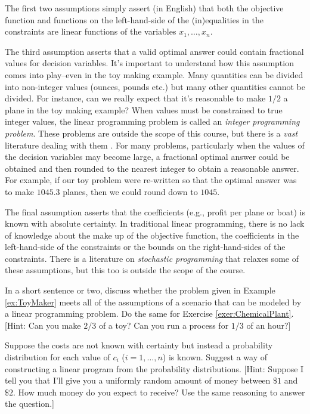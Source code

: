 The first two assumptions simply assert (in English) that both the objective function and functions on the left-hand-side of the (in)equalities in the constraints are linear functions of the variables $x_1,\dots,x_n$. 

The third assumption asserts that a valid optimal answer could contain fractional values for decision variables. It's important to understand how this assumption comes into play--even in the toy making example. Many quantities can be divided into non-integer values (ounces, pounds etc.) but many other quantities cannot be divided. For instance, can we really expect that it's reasonable to make $1/2$ a plane in the toy making example? When values must be constrained to true integer values, the linear programming problem is called an \textit{integer programming problem}. These problems are outside the scope of this course, but there is a \textit{vast} literature dealing with them \cite{PS98,WN99}. For many problems, particularly when the values of the decision variables may become large, a fractional optimal answer could be obtained and then rounded to the nearest integer to obtain a reasonable answer. For example, if our toy problem were re-written so that the optimal answer was to make $1045.3$ planes, then we could round down to $1045$.

The final assumption asserts that the coefficients (e.g., profit per plane or boat) is known with absolute certainty. In traditional linear programming, there is no lack of knowledge about the make up of the objective function, the coefficients in the left-hand-side of the constraints or the bounds on the right-hand-sides of the constraints. There is a literature on \textit{stochastic programming} \cite{KW94,BN02} that relaxes some of these assumptions, but this too is outside the scope of the course.

\begin{exercise} In a short sentence or two, discuss whether the problem given in Example \ref{ex:ToyMaker} meets all of the assumptions of a scenario that can be  modeled by a linear programming problem. Do the same for Exercise \ref{exer:ChemicalPlant}. [Hint: Can you make $2/3$ of a toy? Can you run a process for $1/3$ of an hour?]
\end{exercise}

\begin{exercise} Suppose the costs are not known with certainty but instead a probability distribution for each value of $c_i$ ($i=1,\dots,n$) is known. Suggest a way of constructing a linear program from the probability distributions. [Hint: Suppose I tell you that I'll give you a uniformly random amount of money between $\$1$ and $\$2$. How much money do you expect to receive? Use the same reasoning to answer the question.]
\end{exercise}

